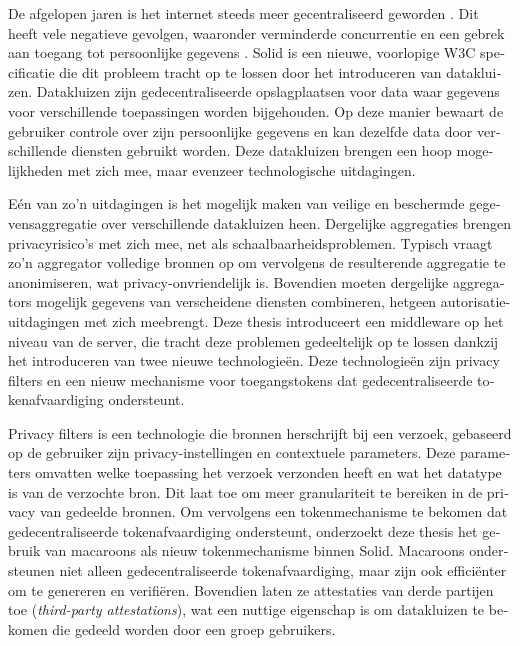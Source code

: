 \begin{abstract*}
  \begin{otherlanguage}{dutch}
  De afgelopen jaren is het internet steeds meer gecentraliseerd geworden \citep{internet-report}. Dit heeft vele negatieve gevolgen, waaronder verminderde concurrentie en een gebrek aan toegang tot persoonlijke gegevens \citep{big-tech-innovation, platform-monopolies}. Solid \citep{solid} is een nieuwe, voorlopige W3C specificatie die dit probleem tracht op te lossen door het introduceren van datakluizen. Datakluizen zijn gedecentraliseerde opslagplaatsen voor data waar gegevens voor verschillende toepassingen worden bijgehouden. Op deze manier bewaart de gebruiker controle over zijn persoonlijke gegevens en kan dezelfde data door verschillende diensten gebruikt worden. Deze datakluizen brengen een hoop mogelijkheden met zich mee, maar evenzeer technologische uitdagingen. 
  
  E{\'e}n van zo'n uitdagingen is het mogelijk maken van veilige en beschermde gegevensaggregatie over verschillende datakluizen heen. Dergelijke aggregaties brengen privacyrisico's met zich mee, net als schaalbaarheidsproblemen. Typisch vraagt zo'n aggregator volledige bronnen op om vervolgens de resulterende aggregatie te anonimiseren, wat privacy-onvriendelijk is. Bovendien moeten dergelijke aggregators mogelijk gegevens van verscheidene diensten combineren, hetgeen autorisatie-uitdagingen met zich meebrengt. Deze thesis introduceert een middleware op het niveau van de server, die tracht deze problemen gedeeltelijk op te lossen dankzij het introduceren van twee nieuwe technologie{\"e}n. Deze technologie{\"e}n zijn privacy filters en een nieuw mechanisme voor toegangstokens dat gedecentraliseerde tokenafvaardiging ondersteunt.

  Privacy filters is een technologie die bronnen herschrijft bij een verzoek, gebaseerd op de gebruiker zijn privacy-instellingen en contextuele parameters. Deze parameters omvatten welke toepassing het verzoek verzonden heeft en wat het datatype is van de verzochte bron. Dit laat toe om meer granulariteit te bereiken in de privacy van gedeelde bronnen. Om vervolgens een tokenmechanisme te bekomen dat gedecentraliseerde tokenafvaardiging ondersteunt, onderzoekt deze thesis het gebruik van macaroons als nieuw tokenmechanisme binnen Solid. Macaroons ondersteunen niet alleen gedecentraliseerde tokenafvaardiging, maar zijn ook effici{\"e}nter om te genereren en verifi{\"e}ren. Bovendien laten ze attestaties van derde partijen toe (\textit{third-party attestations}), wat een nuttige eigenschap is om datakluizen te bekomen die gedeeld worden door een groep gebruikers.
  

\end{otherlanguage}
\end{abstract*}
